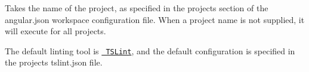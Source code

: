 Takes the name of the project, as specified in the {\ttfamily projects} section of the {\ttfamily angular.\+json} workspace configuration file. When a project name is not supplied, it will execute for all projects.

The default linting tool is \href{https://palantir.github.io/tslint/}{\texttt{ TSLint}}, and the default configuration is specified in the project\textquotesingle{}s {\ttfamily tslint.\+json} file. 